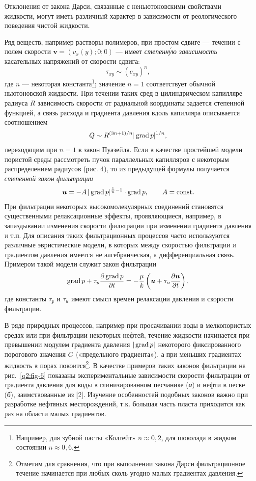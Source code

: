 Отклонения от закона Дарси, связанные с неньютоновскими свойствами жидкости, могут иметь различный характер в зависимости от реологического поведения чистой жидкости.

\setcounter{footnote}{0}
Ряд веществ, например растворы полимеров, при простом сдвиге --- течении с полем скорости $\boldsymbol{v}=(v_x(y);0;0)$ --- имеет \textit{степенн\'ую зависимость} касательных напряжений от скорости сдвига:
\[
\tau_{xy}\sim(e_{xy})^n,
\]
где $n$ --- некоторая константа\footnote{Например, для зубной пасты «Колгейт» $n\approx0{,}2$, для шоколада в жидком состоянии $n\approx0{,}6$.}; значение $n=1$ соответствует обычной ньютоновской жидкости. При течении таких сред в цилиндрическом капилляре радиуса $R$ зависимость скорости от радиальной координаты задается степенной функцией, а связь расхода и градиента давления вдоль капилляра описывается соотношением
\[
Q\sim R^{(3n+1)/n}|\operatorname{grad} p|^{1/n},
\]
переходящим при $n=1$ в закон Пуазейля. Если в качестве простейшей модели пористой среды рассмотреть пучок параллельных капилляров с некоторым распределением радиусов (рис. 4), то из предыдущей формулы получается \textit{степенной закон фильтрации}
\[
\boldsymbol{u}=-A\,|\operatorname{grad} p|^{\frac{1}{n}-1}\cdot\operatorname{grad} p,\qquad A=\mathrm{const}.
\]
При фильтрации некоторых высокомолекулярных соединений становятся существенными релаксационные эффекты, проявляющиеся, например, в запаздывании изменения скорости фильтрации при изменении градиента давления и т.п. Для описания таких фильтрационных процессов часто используются различные эвристические модели, в которых между скоростью фильтрации и градиентом давления имеется не алгебраическая, а дифференциальная связь. Примером такой модели служит закон фильтрации
\[
\operatorname{grad} p+\tau_p\frac{\partial\operatorname{grad} p}{\partial t}=-\frac{\mu}{k}\left(\boldsymbol{u}+\tau_u\frac{\partial\boldsymbol{u}}{\partial t}\right),
\]
где константы $\tau_p$ и $\tau_u$ имеют смысл времен релаксации давления и скорости фильтрации.

В ряде природных процессов, например при просачивании воды в мелкопористых средах или при фильтрации некоторых нефтей, течение жидкости начинается при превышении модулем градиента давления $|\operatorname{grad} p|$ некоторого фиксированного порогового
значения $G$ («предельного градиента»), а при меньших градиентах жидкость в порах покоится\setcounter{footnote}{0}\footnote{Отметим для сравнения, что при выполнении закона Дарси фильтрационное течение начинается при любых сколь угодно малых градиентах давления.}. В качестве примеров таких законов фильтрации на рис.~\ref{q2:fig-6} показаны экспериментальные зависимости скорости фильтрации от градиента давления для воды в глинизированном песчанике (\textit{а}) и нефти в песке (\textit{б}), заимствованные из [2]. Изучение особенностей подобных законов важно при разработке нефтяных месторождений, т.к. большая часть пласта приходится как раз на области малых градиентов.

